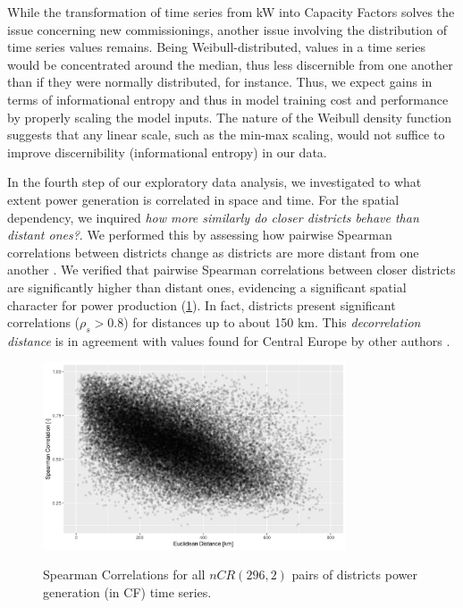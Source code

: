 While the transformation of time series from kW into Capacity Factors solves the issue concerning new commissionings, another issue involving the distribution of time series values remains.
Being Weibull-distributed, values in a time series would be concentrated around the median, thus less discernible from one another than if they were normally distributed, for instance.
Thus, we expect gains in terms of informational entropy and thus in model training cost and performance by properly scaling the model inputs.
The nature of the Weibull density function suggests that any linear scale, such as the min-max scaling, would not suffice to improve discernibility (informational entropy) in our data.

In the fourth step of our exploratory data analysis, we investigated to what extent power generation is correlated in space and time.
For the spatial dependency, we inquired \textit{how more similarly do closer districts behave than distant ones?}.
We performed this by assessing how pairwise Spearman correlations between districts change as districts are more distant from one another \cite{engeland2017variability}.
We verified that pairwise Spearman correlations between closer districts are significantly higher than distant ones, evidencing a significant spatial character for power production (\ref{fig:correlogram}).
In fact, districts present significant correlations ($\rho_s>0.8$) for distances up to about 150 km.
This \textit{decorrelation distance} is in agreement with values found for Central Europe by other authors \cite{engeland2017variability}.

\begin{figure}[H]%
   \centering
    \caption{Spearman Correlations for all $nCR(296, 2)$ pairs of districts power generation (in CF) time series.}
    \includegraphics[width=0.8\textwidth]{correlation-spearman-vs-distance}
   \label{fig:correlogram}
\end{figure}

